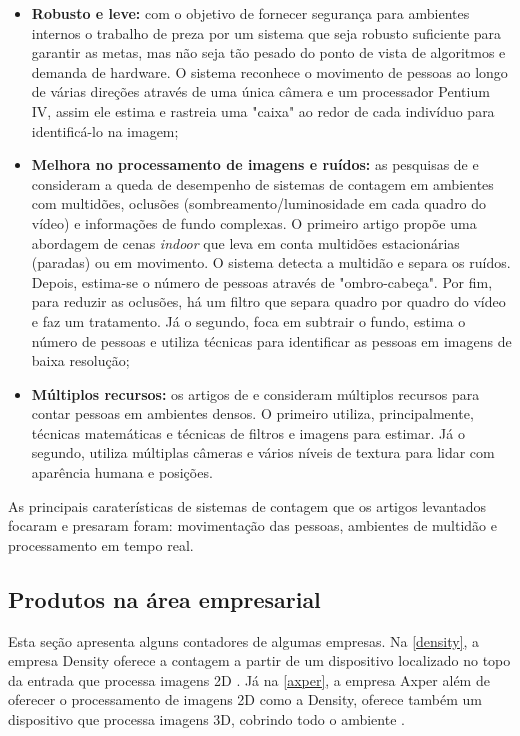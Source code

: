 \begin{itemize}

  \item \textbf{Robusto e leve:} com o objetivo de fornecer segurança para ambientes internos
  o trabalho de  preza por um sistema que seja robusto suficiente para garantir as metas, mas
  não seja tão pesado do ponto de vista de algoritmos e demanda de hardware. O sistema reconhece o movimento de pessoas
  ao longo de várias direções através de uma única câmera e um processador Pentium IV, assim ele estima e rastreia uma "caixa"  ao redor de cada indivíduo
  para identificá-lo na imagem;

  \item \textbf{Melhora no processamento de imagens e ruídos:} as pesquisas de  e  consideram
  a queda de desempenho de sistemas de contagem em ambientes com multidões, oclusões (sombreamento/luminosidade
  em cada quadro do vídeo) e informações de fundo complexas. O primeiro artigo propõe uma abordagem de cenas \emph{indoor}
  que leva em conta multidões estacionárias (paradas) ou em movimento. O sistema detecta a multidão e separa
  os ruídos. Depois, estima-se o número de pessoas através de "ombro-cabeça". Por fim, para reduzir as oclusões,
  há um filtro que separa quadro por quadro do vídeo e faz um tratamento. Já o segundo, foca em subtrair o fundo, estima
  o número de pessoas e utiliza técnicas para identificar as pessoas em imagens de baixa resolução;

  \item \textbf{Múltiplos recursos:} os artigos de  e  consideram múltiplos recursos para contar pessoas
  em ambientes densos. O primeiro utiliza, principalmente, técnicas matemáticas e técnicas de filtros e imagens para estimar. Já o segundo, utiliza
  múltiplas câmeras e vários níveis de textura para lidar com aparência humana e posições.

\end{itemize}

  As principais caraterísticas de sistemas de contagem que os artigos levantados focaram e presaram foram: movimentação das pessoas,
  ambientes de multidão e processamento em tempo real.

\subsection{Produtos na área empresarial}
\label{produtos-empresas}
Esta seção apresenta alguns contadores de algumas empresas. Na \autoref{density}, a empresa Density oferece a contagem a partir de um
dispositivo localizado no topo da entrada que processa imagens 2D \cite{Density2017}. Já na \autoref{axper}, a empresa Axper além de oferecer
o processamento de imagens 2D como a Density, oferece também um dispositivo que processa imagens 3D, cobrindo todo o ambiente \cite{Axper2017}.

